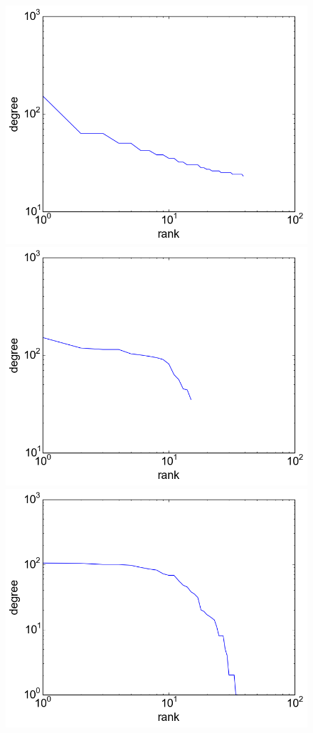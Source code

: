 \documentclass[12pt]{article}
\begin{document}
\begin{figure}
  \centering
    \includegraphics[scale=0.4]{degrees_sinusoid}
    \includegraphics[scale=0.4]{degrees_logit}
    \includegraphics[scale=0.4]{degrees_fbm}

\end{figure}
\end{document}
